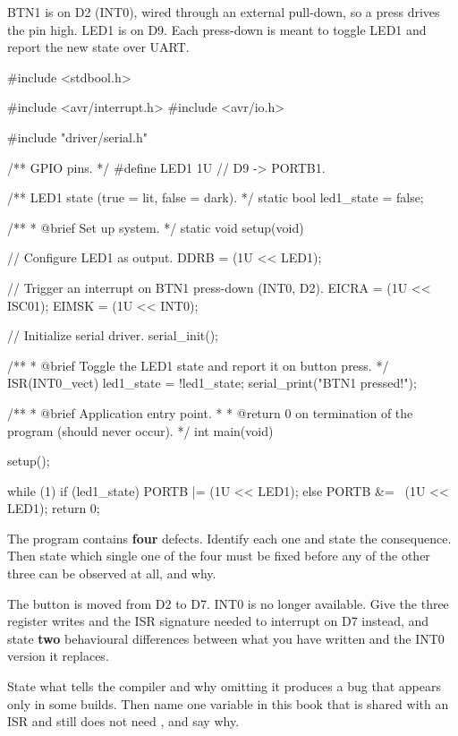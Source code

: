 \label{exa:q:3}

BTN1 is on D2 (INT0), wired through an external pull-down, so a press drives the pin high. LED1 is
on D9. Each press-down is meant to toggle LED1 and report the new state over UART.

\begin{ccode}
#include <stdbool.h>

#include <avr/interrupt.h>
#include <avr/io.h>

#include "driver/serial.h"

/** GPIO pins. */
#define LED1 1U // D9 -> PORTB1.

/** LED1 state (true = lit, false = dark). */
static bool led1_state = false;

/**
 * @brief Set up system.
 */
static void setup(void)
{
    // Configure LED1 as output.
    DDRB = (1U << LED1);

    // Trigger an interrupt on BTN1 press-down (INT0, D2).
    EICRA = (1U << ISC01);
    EIMSK = (1U << INT0);

    // Initialize serial driver.
    serial_init();
}

/**
 * @brief Toggle the LED1 state and report it on button press.
 */
ISR(INT0_vect)
{
    led1_state = !led1_state;
    serial_print("BTN1 pressed!");
}

/**
 * @brief Application entry point.
 *
 * @return 0 on termination of the program (should never occur).
 */
int main(void)
{
    setup();

    while (1)
    {
        if (led1_state) { PORTB |= (1U << LED1); }
        else { PORTB &= ~(1U << LED1); }
    }
    return 0;
}
\end{ccode}

 The program contains \textbf{four} defects. Identify each one and state the consequence.
Then state which single one of the four must be fixed before any of the other three can be
observed at all, and why. 

 The button is moved from D2 to D7. INT0 is no longer available. Give the three register
writes and the ISR signature needed to interrupt on D7 instead, and state \textbf{two} behavioural
differences between what you have written and the INT0 version it replaces. 

 State what  tells the compiler and why omitting it produces a bug that
appears only in some builds. Then name one variable in this book that is shared with an ISR and
still does not need , and say why. 


